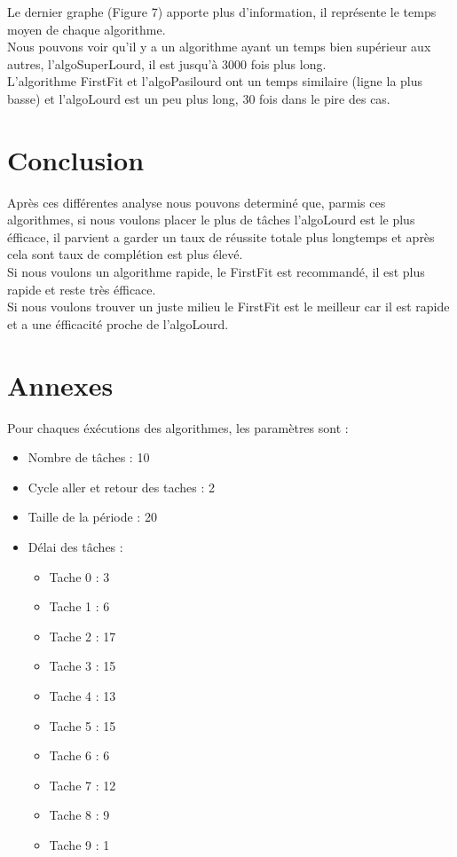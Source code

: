 \documentclass[11pt]{article}
\begin{document}
Le dernier graphe (Figure 7) apporte plus d'information, il représente le temps moyen de chaque algorithme.\\
Nous pouvons voir qu'il y a un algorithme ayant un temps bien supérieur aux autres, l'algoSuperLourd, il est jusqu'à 3000 fois plus long.\\
L'algorithme FirstFit et l'algoPasilourd ont un temps similaire (ligne la plus basse) et l'algoLourd est un peu plus long, 30 fois dans le pire des cas.\\



\section{Conclusion}

Après ces différentes analyse nous pouvons determiné que, parmis ces algorithmes, si nous voulons placer le plus de tâches l'algoLourd est le plus éfficace, il parvient a garder un taux de réussite totale plus longtemps et après cela sont taux de complétion est plus élevé.\\
Si nous voulons un algorithme rapide, le FirstFit est recommandé, il est plus rapide et reste très éfficace. \\
Si nous voulons trouver un juste milieu le FirstFit est le meilleur car il est rapide et a une éfficacité proche de l'algoLourd.\\

\newpage
\section{Annexes}
Pour chaques éxécutions des algorithmes, les paramètres sont :
\begin{itemize}
    \item Nombre de tâches : 10
    \item Cycle aller et retour des taches : 2
    \item Taille de la période : 20
    \item Délai des tâches :
    \begin{itemize}
        \item Tache 0 : 3
        \item Tache 1 : 6
        \item Tache 2 : 17
        \item Tache 3 : 15
        \item Tache 4 : 13
        \item Tache 5 : 15
        \item Tache 6 : 6
        \item Tache 7 : 12
        \item Tache 8 : 9
        \item Tache 9 : 1
    \end{itemize}
\end{itemize}
\end{document}
